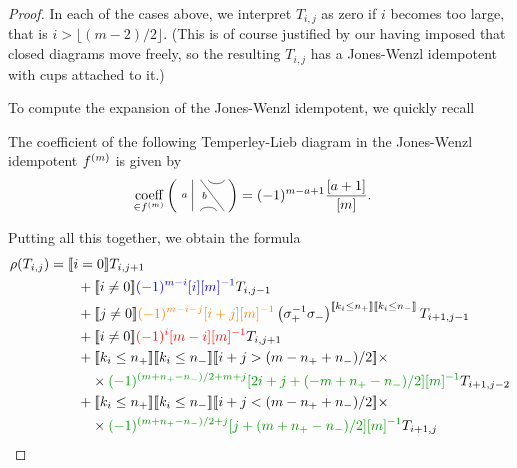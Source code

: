 \documentclass[12pt]{article}
\begin{document}
\begin{proof}
In each of the cases above, we interpret $T_{i,j}$ as zero if $i$ becomes too large, that is $i > \lfloor (m-2)/2 \rfloor$. (This is of course justified by our having imposed that closed diagrams move freely, so the resulting $T_{i,j}$ has a Jones-Wenzl idempotent with cups attached to it.)

To compute the expansion of the Jones-Wenzl idempotent, we quickly recall
\begin{lem}
The coefficient of the following Temperley-Lieb diagram in the Jones-Wenzl idempotent $f^{(m)}$ is given by
\begin{align*}
\underset{\in \jw{m}}{\textrm{coeff}}
\left(
\begin{tikzpicture}[baseline = -.1cm, yscale=-.5]
	\draw (-.5,-.8)--(-.5,.8);
	\draw (-.3,.8) arc (-180:0:.2cm);
	\draw (-.3,-.8)--(.3,.8);
	\draw (-.1,-.8) arc (180:0:.2cm);
	\node at (-.7,0) {{\scriptsize{$a$}}};
	\node at (-.2,0) {{\scriptsize{$b$}}};
    \node at (.2,0) {$\phantom{c}$};
\end{tikzpicture}
\right)
& =
(-1)^{m-a+1}\frac{[a+1]}{[m]}.
\end{align*}
\end{lem}

  
Putting all this together, we obtain the formula
\begin{align*}
\rho(T_{i,j}) & =
\truth{i = 0} T_{i, j + 1} \\
& \qquad +
\truth{i \neq 0} \textcolor{blue}{(-1)^{m-i} [i][m]^{-1}} T_{i,j-1} \\
& \qquad +
\truth{j \neq 0}\textcolor{orange}{(-1)^{m-i-j} [i+j][m]^{-1}} \left(\sigma_+^{-1} \sigma_-\right)^{\truth{k_i \leq n_+} \truth{k_i \leq n_-}} T_{i+1, j-1} \\
& \qquad +
\truth{i \neq 0}\textcolor{red}{(-1)^{i}  [m-i][m]^{-1}} T_{i, j + 1} \\
& \qquad +
\truth{k_i \leq n_+} \truth{k_i \leq n_-}
\truth{i+j > (m - n_+ + n_-)/2} \times \\
& \qquad \quad \times \textcolor{DarkGreen}{(-1)^{(m + n_+ - n_-)/2 +m+ j} [2i + j + (-m + n_+ - n_-)/2][m]^{-1}} T_{i+1,j-2} \\
& \qquad +
\truth{k_i \leq n_+} \truth{k_i \leq n_-}
\truth{i+j < (m - n_+ + n_-)/2} \times \\
& \qquad \quad \times \textcolor{DarkGreen}{(-1)^{(m + n_+ - n_-)/2 + j} [j+ (m + n_+ - n_-)/2 ][m]^{-1}} T_{i+1,j}
\end{align*}


\end{proof}
\end{document}
